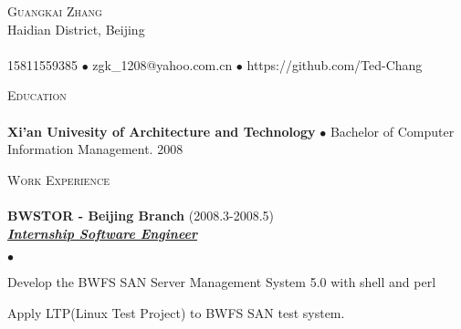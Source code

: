 \documentclass{article}
\newcommand{\lineunder}{\vspace*{-8pt} \\ \hspace*{-18pt} \hrulefill \\}
\newcommand{\header}[1]{{\hspace*{-15pt}\vspace*{6pt} \textsc{#1}} \vspace*{-6pt} \lineunder}
\newcommand{\employer}[3]{{ \textbf{#1} (#2)\\ \underline{\textbf{\emph{#3}}}\\}}
\newcommand{\contact}[3]{\vspace*{-8pt} \begin{center}{\LARGE \scshape {#1}}\\ #2 \lineunder
    #3 \end{center} \vspace*{-8pt}
}
\newenvironment{achievements}{\begin{list}{$\bullet$}{\topsep 0pt
      \itemsep -2pt}}{\vspace*{6pt}\end{list}}
\newcommand{\school}[2]{\textbf{#1} $\bullet$ #2 \vspace*{5pt}}
\begin{document}
\small
\smallskip
\vspace*{-44pt}

\contact{Guangkai Zhang}
{Haidian District, Beijing}
{15811559385 $\bullet$ zgk\_1208@yahoo.com.cn $\bullet$ https://github.com/Ted-Chang}


\header{Education}
\school{Xi'an Univesity of Architecture and
  Technology}{Bachelor of Computer Information Management. 2008}


\header{Work Experience}
\employer{BWSTOR - Beijing Branch}{2008.3-2008.5}{Internship Software Engineer}
        \begin{achievements}
        \item Develop the BWFS SAN Server Management System 5.0 with
          shell and perl
        \item Apply LTP(Linux Test Project) to BWFS SAN test system.
        \end{achievements}
\end{document}
